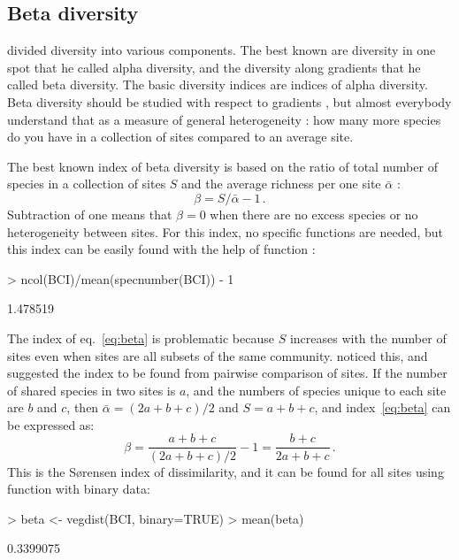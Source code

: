 \documentclass[a4paper,10pt,twocolumn]{article}
\begin{document}
\subsection{Beta diversity}

\citet{Whittaker60} divided diversity into various components. The
best known are diversity in one spot that he called alpha diversity,
and the diversity along gradients that he called beta diversity. The
basic diversity indices are indices of alpha diversity. Beta diversity
should be studied with respect to gradients \citep{Whittaker60}, but
almost everybody understand that as a measure of general heterogeneity
\citep{Tuomisto10a, Tuomisto10b}: how many more species do you have in
a collection of sites compared to an average site.

The best known index of beta diversity is based on the ratio of total
number of species in a collection of sites $S$ and the average
richness per one site $\bar \alpha$ \citep{Tuomisto10a}:
\begin{equation}
  \label{eq:beta}
  \beta = S/\bar \alpha - 1 \,.
\end{equation}
Subtraction of one means that $\beta = 0$ when there are no excess
species or no heterogeneity between sites. For this index, no specific
functions are needed, but this index can be easily found with the help
of  function :
\begin{Schunk}
\begin{Sinput}
> ncol(BCI)/mean(specnumber(BCI)) - 1
\end{Sinput}
\begin{Soutput}
[1] 1.478519
\end{Soutput}
\end{Schunk}

The index of eq.~\ref{eq:beta} is problematic because $S$ increases
with the number of sites even when sites are all subsets of the same
community.  \citet{Whittaker60} noticed this, and suggested the index
to be found from pairwise comparison of sites. If the number of shared
species in two sites is $a$, and the numbers of species unique to each
site are $b$ and $c$, then $\bar \alpha = (2a + b + c)/2$ and $S =
a+b+c$, and index~\ref{eq:beta} can be expressed as:
\begin{equation}
  \label{eq:betabray}
  \beta = \frac{a+b+c}{(2a+b+c)/2} - 1 = \frac{b+c}{2a+b+c} \,.
\end{equation}
This is the S{\o}rensen index of dissimilarity, and it can be found
for all sites using  function  with
binary data:
\begin{Schunk}
\begin{Sinput}
> beta <- vegdist(BCI, binary=TRUE)
> mean(beta)
\end{Sinput}
\begin{Soutput}
[1] 0.3399075
\end{Soutput}
\end{Schunk}
\end{document}

